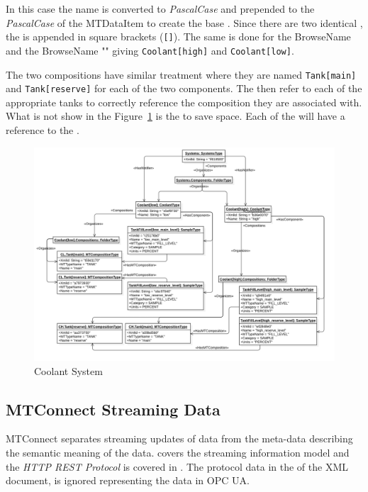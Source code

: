 In this case the  name is converted to \textit{PascalCase} and prepended to the \textit{PascalCase} of the \gls{MTDataItem} to create the base . Since there are two identical , the  is appended in square brackets (\texttt{[]}). The same is done for the  \gls{BrowseName} and the  \gls{BrowseName} "" giving \texttt{Coolant[high]} and \texttt{Coolant[low]}.

The two  compositions have similar treatment where they are named \texttt{Tank[main]} and \texttt{Tank[reserve]} for each of the two components. The  then refer to each of the appropriate tanks to correctly reference the composition they are associated with. What is not show in the Figure~\ref{fig:coolant-system} is the  to save space. Each of the  will have a  reference to the .

\begin{figure}[ht]
  \centering
  \includegraphics[width=1.0\textwidth]{diagrams/mtconnect-mapping/coolant-system.png}
  \caption{Coolant System}
  \label{fig:coolant-system}
\end{figure}

\FloatBarrier

\subsection{MTConnect Streaming Data}

MTConnect separates streaming updates of data from the meta-data describing the semantic meaning of the data. \cite{MTCPart3} covers the streaming information model and the \textit{HTTP REST Protocol}\cite{Fielding2000ArchitecturalArchitectures} is covered in \cite{MTCPart1}. The protocol data in the  of the XML document, is ignored representing the data in OPC UA. 

